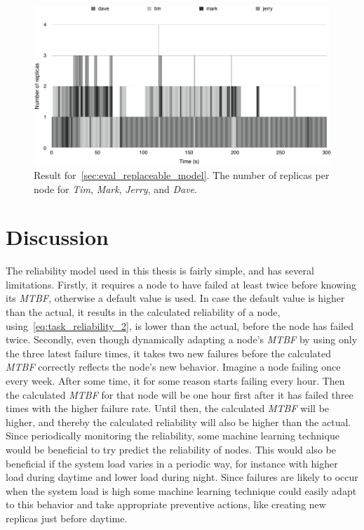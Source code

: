 \documentclass{cslthse-msc}
\begin{document}
\begin{figure}[!hbt]
\centering
\includegraphics[scale=0.5]{images/results/loads/unloaded.pdf}
\caption[Number of replicas in~\cref{sec:eval_replaceable_model}, all nodes but \emph{Kevin}]{Result for~\cref{sec:eval_replaceable_model}. The number of replicas per node for \emph{Tim}, \emph{Mark}, \emph{Jerry}, and \emph{Dave}.} \label{fig:eval_replaceable_model_unloaded}
\end{figure}

\chapter{Discussion} \label{ch:discussion}
The reliability model used in this thesis is fairly simple, and has several limitations. Firstly, it requires a node to have failed at least twice before knowing its \emph{MTBF}, otherwise a default value is used. In case the default value is higher than the actual, it results in the calculated reliability of a node, using~\cref{eq:task_reliability_2}, is lower than the actual, before the node has failed twice. Secondly, even though dynamically adapting a node's \emph{MTBF} by using only the three latest failure times, it takes two new failures before the calculated \emph{MTBF} correctly reflects the node's new behavior. Imagine a node failing once every week. After some time, it for some reason starts failing every hour. Then the calculated \emph{MTBF} for that node will be one hour first after it has failed three times with the higher failure rate. Until then, the calculated \emph{MTBF} will be higher, and thereby the calculated reliability will also be higher than the actual. Since periodically monitoring the reliability, some machine learning technique would be beneficial to try predict the reliability of nodes. This would also be beneficial if the system load varies in a periodic way, for instance with higher load during daytime and lower load during night. Since failures are likely to occur when the system load is high some machine learning technique could easily adapt to this behavior and take appropriate preventive actions, like creating new replicas just before daytime.
\end{document}
